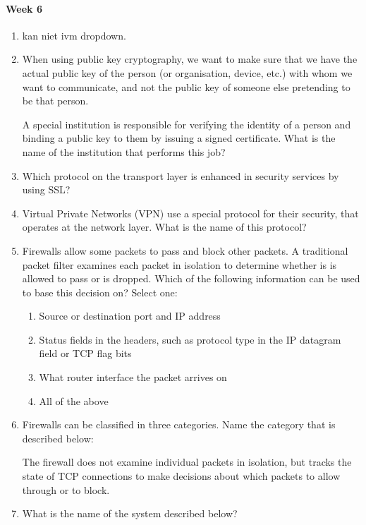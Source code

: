 \paragraph{Week 6}
\begin{enumerate}
    \item kan niet ivm dropdown.
    \item When using public key cryptography, we want to make sure that we have the actual public key of the person (or organisation, device, etc.) with whom we want to communicate, and not the public key of someone else pretending to be that person.

    A special institution is responsible for verifying the identity of a person and binding a public key to them by issuing a signed certificate. What is the name of the institution that performs this job?
    \item Which protocol on the transport layer is enhanced in security services by using SSL?
    \item Virtual Private Networks (VPN) use a special protocol for their security, that operates at the network layer. What is the name of this protocol?
    \item Firewalls allow some packets to pass and block other packets. A traditional packet filter examines each packet in isolation to determine whether is is allowed to pass or is dropped. Which of the following information can be used to base this decision on?
    Select one:
    \begin{enumerate}
        \item Source or destination port and IP address
        \item Status fields in the headers, such as protocol type in the IP datagram field or TCP flag bits
        \item What router interface the packet arrives on
        \item All of the above
    \end{enumerate}
    \item Firewalls can be classified in three categories. Name the category that is described below:

    The firewall does not examine individual packets in isolation, but tracks the state of TCP connections to make decisions about which packets to allow through or to block.
    \item What is the name of the system described below?


\end{enumerate}
